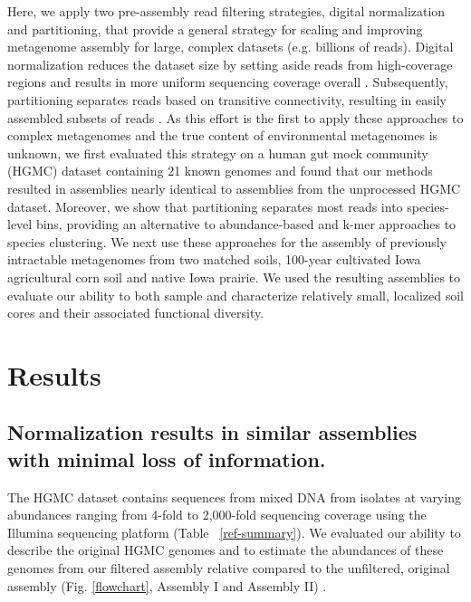 \documentclass{pnastwo}
\begin{document}
\begin{article}
Here, we apply two pre-assembly read filtering strategies, digital
normalization and partitioning, that provide a general strategy for scaling and
improving metagenome assembly for large, complex datasets (e.g. billions of reads). 
Digital normalization reduces the dataset size by setting aside reads from high-coverage
regions and results in more uniform sequencing coverage overall \cite{browndiginorm}. Subsequently, partitioning separates reads based
on transitive connectivity, resulting in easily assembled subsets of reads \cite{Pell:2012cq}. 
As this effort is the first to apply these approaches to complex metagenomes and the true content of environmental metagenomes is unknown, 
we first evaluated this strategy on a human gut mock community (HGMC) dataset containing 21 known genomes and found that our 
methods resulted in assemblies nearly identical to assemblies from the unprocessed HGMC
dataset.  Moreover, we show that partitioning separates most reads into
species-level bins, providing an alternative to abundance-based and k-mer
approaches to species clustering.  We next use these approaches for the assembly of previously intractable
metagenomes from two matched soils, 100-year cultivated Iowa agricultural corn soil
and native Iowa prairie.  We used the resulting assemblies to evaluate our ability to both sample and characterize relatively small, localized soil cores and their associated functional diversity.

\section*{Results} \subsection*{Normalization results in similar assemblies with minimal loss of information.} 
The HGMC dataset contains sequences from mixed DNA from isolates at varying abundances ranging from 4-fold to
2,000-fold sequencing coverage using the Illumina sequencing platform (Table ~\ref{ref-summary}). We evaluated our ability to describe the original HGMC genomes and to estimate the abundances of these genomes from our filtered assembly relative compared to the unfiltered, original assembly (Fig. \ref{flowchart}, Assembly I and Assembly II) .  


\end{article}
\end{document}
